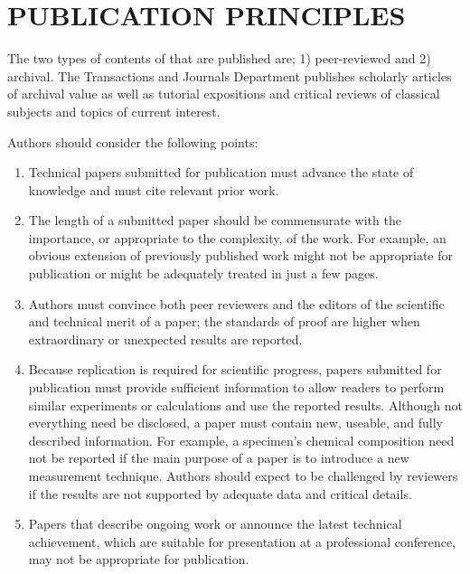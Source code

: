 \section{PUBLICATION PRINCIPLES}
The two types of contents of that are published are; 1) peer-reviewed and 2) 
archival. The Transactions and Journals Department publishes scholarly 
articles of archival value as well as tutorial expositions and critical 
reviews of classical subjects and topics of current interest. 

Authors should consider the following points:

\begin{enumerate}
\item Technical papers submitted for publication must advance the state of knowledge and must cite relevant prior work. 
\item The length of a submitted paper should be commensurate with the importance, or appropriate to the complexity, of the work. For example, an obvious extension of previously published work might not be appropriate for publication or might be adequately treated in just a few pages.
\item Authors must convince both peer reviewers and the editors of the scientific and technical merit of a paper; the standards of proof are higher when extraordinary or unexpected results are reported. 
\item Because replication is required for scientific progress, papers submitted for publication must provide sufficient information to allow readers to perform similar experiments or calculations and use the reported results. Although not everything need be disclosed, a paper must contain new, useable, and fully described information. For example, a specimen's chemical composition need not be reported if the main purpose of a paper is to introduce a new measurement technique. Authors should expect to be challenged by reviewers if the results are not supported by adequate data and critical details.
\item Papers that describe ongoing work or announce the latest technical achievement, which are suitable for presentation at a professional conference, may not be appropriate for publication.
\end{enumerate}